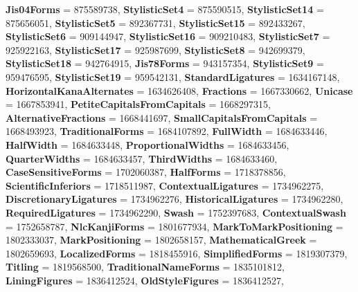 \begin{DoxyCompactItemize}
{\bfseries Jis04\+Forms} = 875589738, 
{\bfseries Stylistic\+Set4} = 875590515, 
\newline
{\bfseries Stylistic\+Set14} = 875656051, 
{\bfseries Stylistic\+Set5} = 892367731, 
{\bfseries Stylistic\+Set15} = 892433267, 
{\bfseries Stylistic\+Set6} = 909144947, 
\newline
{\bfseries Stylistic\+Set16} = 909210483, 
{\bfseries Stylistic\+Set7} = 925922163, 
{\bfseries Stylistic\+Set17} = 925987699, 
{\bfseries Stylistic\+Set8} = 942699379, 
\newline
{\bfseries Stylistic\+Set18} = 942764915, 
{\bfseries Jis78\+Forms} = 943157354, 
{\bfseries Stylistic\+Set9} = 959476595, 
{\bfseries Stylistic\+Set19} = 959542131, 
\newline
{\bfseries Standard\+Ligatures} = 1634167148, 
{\bfseries Horizontal\+Kana\+Alternates} = 1634626408, 
{\bfseries Fractions} = 1667330662, 
{\bfseries Unicase} = 1667853941, 
\newline
{\bfseries Petite\+Capitals\+From\+Capitals} = 1668297315, 
{\bfseries Alternative\+Fractions} = 1668441697, 
{\bfseries Small\+Capitals\+From\+Capitals} = 1668493923, 
{\bfseries Traditional\+Forms} = 1684107892, 
\newline
{\bfseries Full\+Width} = 1684633446, 
{\bfseries Half\+Width} = 1684633448, 
{\bfseries Proportional\+Widths} = 1684633456, 
{\bfseries Quarter\+Widths} = 1684633457, 
\newline
{\bfseries Third\+Widths} = 1684633460, 
{\bfseries Case\+Sensitive\+Forms} = 1702060387, 
{\bfseries Half\+Forms} = 1718378856, 
{\bfseries Scientific\+Inferiors} = 1718511987, 
\newline
{\bfseries Contextual\+Ligatures} = 1734962275, 
{\bfseries Discretionary\+Ligatures} = 1734962276, 
{\bfseries Historical\+Ligatures} = 1734962280, 
{\bfseries Required\+Ligatures} = 1734962290, 
\newline
{\bfseries Swash} = 1752397683, 
{\bfseries Contextual\+Swash} = 1752658787, 
{\bfseries Nlc\+Kanji\+Forms} = 1801677934, 
{\bfseries Mark\+To\+Mark\+Positioning} = 1802333037, 
\newline
{\bfseries Mark\+Positioning} = 1802658157, 
{\bfseries Mathematical\+Greek} = 1802659693, 
{\bfseries Localized\+Forms} = 1818455916, 
{\bfseries Simplified\+Forms} = 1819307379, 
\newline
{\bfseries Titling} = 1819568500, 
{\bfseries Traditional\+Name\+Forms} = 1835101812, 
{\bfseries Lining\+Figures} = 1836412524, 
{\bfseries Old\+Style\+Figures} = 1836412527, 
\newline

\end{DoxyCompactItemize}
